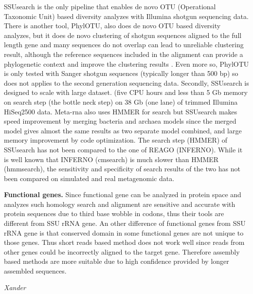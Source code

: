 \documentclass[]{msu-thesis}
\begin{document}
SSUsearch is the only pipeline that enables de novo OTU (Operational Taxonomic Unit) based diversity analyzes with Illumina shotgun sequencing data. There is another tool, PhylOTU, also does de novo OTU based diversity analyzes, but it does de novo clustering of shotgun sequences aligned to the full length gene and many sequences do not overlap can lead to unreliable clustering result, although the reference sequences included in the alignment can provide a phylogenetic context and improve the clustering results \cite{sharpton_phylotu:_2011}. Even more so, PhylOTU is only tested with Sanger shotgun sequences (typically longer than 500 bp) so does not applies to the second generation sequencing data.
Secondly, SSUsearch is designed to scale with large dataset. (five CPU hours and less than 5 Gb memory on search step (the bottle neck step) on 38 Gb (one lane) of trimmed Illumina HiSeq2500 data. Meta-rna \cite{huang_identification_2009} also uses HMMER for search but SSUsearch makes speed improvement by merging bacteria and archaea models since the merged model gives almost the same results as two separate model combined, and large memory improvement by code optimization.
The search step (HMMER) of SSUsearch has not been compared to the one of REAGO (INFERNO). While it is well known that INFERNO (cmsearch) is much slower than HMMER (hmmsearch), the sensitivity and specificity of search results of the two has not been compared on simulated and real metagenomic data.

\textbf{Functional genes.}
Since functional gene can be analyzed in protein space and analyzes such homology search and alignment are sensitive and accurate with protein sequences due to third base wobble in codons, thus their tools are different from SSU rRNA gene. An other difference of functional genes from SSU rRNA gene is that conserved domain in some functional genes are not unique to those genes. Thus short reads based method does not work well since reads from other genes could be incorrectly aligned to the target gene. Therefore assembly based methods are more suitable due to high confidence provided by longer assembled sequences.

\textit{Xander}
\end{document}

